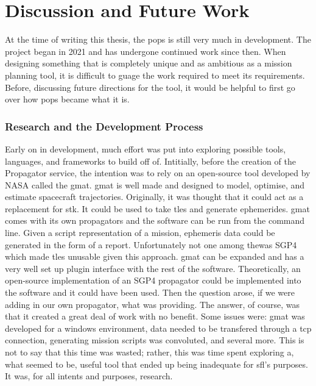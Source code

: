 \glsresetall{} 

\chapter{Discussion and Future Work}

\lettrine[lines=2, findent=0pt, nindent=5pt]{A}{}t the time of writing this
thesis, the \gls{pops} is still very much in development. The project began in
2021 and has undergone continued work since then. When designing something that
is completely unique and as ambitious as a mission planning tool, it is
difficult to guage the work required to meet its requirements. Before,
discussing future directions for the tool, it would be helpful to first go over
how \gls{pops} became what it is. 

\subsection{Research and the Development Process}

Early on in development, much effort was put into exploring possible tools,
languages, and frameworks to build off of. Intitially, before the creation of
the Propagator service, the intention was to rely on an open-source tool
developed by NASA called the \gls{gmat}. \gls{gmat} is well made and designed
to model, optimise, and estimate spacecraft trajectories. Originally, it was
thought that it could act as a replacement for \gls{stk}. It could be used to
take \glspl{tle} and generate ephemerides. \gls{gmat} comes with its own
propagators and the software can be run from the command line. Given a script
representation of a mission, ephemeris data could be generated in the form of a
report. Unfortunately not one among thewas SGP4 which made \glspl{tle} unusable
given this approach. \gls{gmat} can be expanded and has a very well set up
plugin interface with the rest of the software. Theoretically, an open-source
implementation of an SGP4 propagator could be implemented into the software and
it could have been used. Then the question arose, if we were adding in our own
propagator, what was  providing. The answer, of course, was that it
created a great deal of work with no benefit. Some issues were: \gls{gmat} was
developed for a windows environment, data needed to be transfered through a
\gls{tcp} connection, generating mission scripts was convoluted, and several
more. This is not to say that this time was wasted; rather, this was time spent
exploring a, what seemed to be, useful tool that ended up being inadequate for
\gls{sfl}'s purposes. It was, for all intents and purposes, research.

